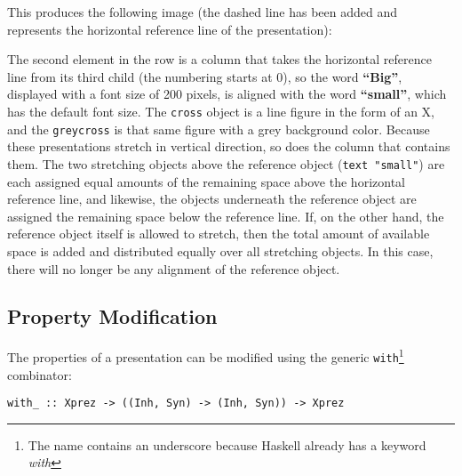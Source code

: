 \par \noindent This produces the following image (the dashed line has
        been added and represents the horizontal reference line of the
        presentation):\begin{center}
\end{center}
\par The second element in the row is a column that takes the horizontal
        reference line from its third child (the numbering starts at 0), so the word
        {\bf ``Big''}, displayed with a font size of 200 pixels, is aligned with the
        word {\bf ``small''}, which has the default font size. The \texttt{cross}
        object is a line figure in the form of an X, and the \texttt{greycross} is that
        same figure with a grey background color. Because these presentations stretch
        in vertical direction, so does the column that contains them. The two
        stretching objects above the reference object (\texttt{text "small"}) are each
        assigned equal amounts of the remaining space above the horizontal reference
        line, and likewise, the objects underneath the reference object are assigned
        the remaining space below the reference line. If, on the other hand, the
        reference object itself is allowed to stretch, then the total amount of
        available space is added and distributed equally over all stretching objects.
        In this case, there will no longer be any alignment of the reference object.
        
\subsection{Property Modification}

\par The properties of a presentation can be modified using the generic
        \texttt{with}\footnote{The name contains an underscore because Haskell
        already has a keyword {\em with}} combinator:\begin{small}\begin{verbatim}with_ :: Xprez -> ((Inh, Syn) -> (Inh, Syn)) -> Xprez\end{verbatim}\end{small}


